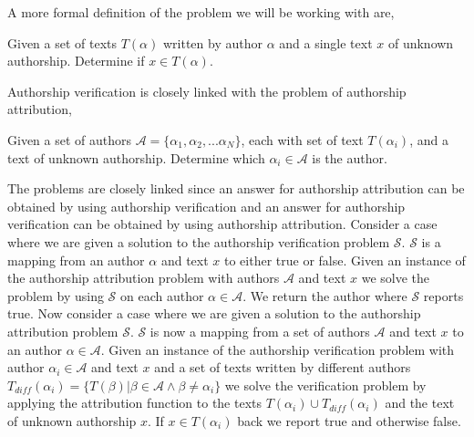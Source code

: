 
A more formal definition of the problem we will be working with are,

\begin{definition}

    Given a set of texts $T(\alpha)$ written by author $\alpha$ and a single
    text $x$ of unknown authorship. Determine if $x \in T(\alpha)$.

\end{definition}

Authorship verification is closely linked with the problem of authorship
attribution,

\begin{definition}

    Given a set of authors $\mathcal{A} = \{ \alpha_1, \alpha_2,...\alpha_N\}$,
    each with set of text $T(\alpha_i)$, and a text of unknown authorship.
    Determine which $\alpha_i \in \mathcal{A}$ is the author.

\end{definition}

The problems are closely linked since an answer for authorship attribution
can be obtained by using authorship verification and an answer for authorship
verification can be obtained by using authorship attribution. Consider a
case where we are given a solution to the authorship verification problem
$\mathcal{S}$. $\mathcal{S}$ is a mapping from an author $\alpha$ and text
$x$ to either true or false. Given an instance of the authorship attribution
problem with authors $\mathcal{A}$ and text $x$ we solve the problem by using
$\mathcal{S}$ on each author $\alpha \in \mathcal{A}$. We return the author
where $\mathcal{S}$ reports true. Now consider a case where we are given a
solution to the authorship attribution problem $\mathcal{S}$. $\mathcal{S}$ is
now a mapping from a set of authors $\mathcal{A}$ and text $x$ to an author
$\alpha \in \mathcal{A}$. Given an instance of the authorship verification
problem with author $\alpha_i \in \mathcal{A}$ and text $x$ and a set of
texts written by different authors $T_{diff}(\alpha_i) = \{T(\beta) | \beta
\in \mathcal{A} \land \beta \neq \alpha_i\}$ we solve the verification
problem by applying the attribution function to the texts $T(\alpha_i)
\cup T_{diff}(\alpha_i)$ and the text of unknown authorship $x$. If $x \in
T(\alpha_i)$ back we report true and otherwise false.
